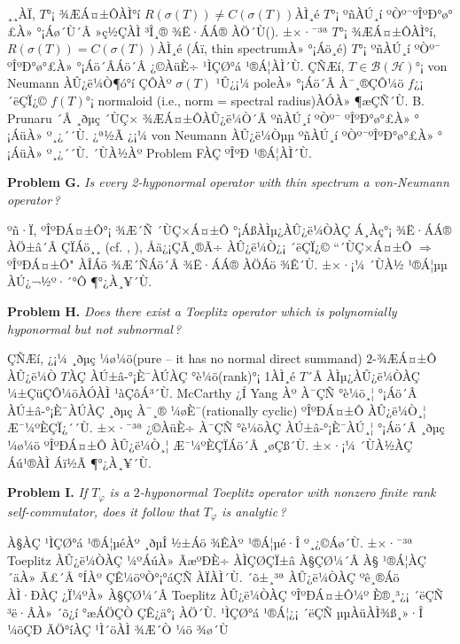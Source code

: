 \documentclass[12pt,a4paper,2sided]{article}
\begin{document}
 ¸¸ÀÏ, $T$°¡ ¾ÆÁ¤±ÔÀÌ°í $R(\sigma(T))\ne
C(\sigma(T))$ÀÌ¸é $T$°¡ ºñÀÚ¸í ºÒº¯ºÎºÐ°ø°£À» °¡Áø´Ù´Â »ç½ÇÀÌ ³Î¸®
¾Ë·ÁÁ® ÀÖ´Ù(\cite{Bro}). ±×·¯³ª $T$°¡ ¾ÆÁ¤±ÔÀÌ°í,
$R(\sigma(T))=C(\sigma(T))$ÀÌ¸é (Áï, thin spectrumÀ» °¡Áö¸é) $T$°¡
ºñÀÚ¸í ºÒº¯ ºÎºÐ°ø°£À» °¡Áö´ÂÁö´Â ¿©ÀüÈ÷ ¹ÌÇØ°á ¹®Á¦ÀÌ´Ù. ÇÑÆí,
$T\in\mathcal{B(H)}$°¡ von Neumann ÀÛ¿ë¼Ò¶ó°í ÇÔÀº $\sigma(T)$
¹Û¿¡¼­ poleÀ» °¡Áö´Â À¯¸®ÇÔ¼ö $f$¿¡ ´ëÇÏ¿© $f(T)$°¡ normaloid (i.e.,
norm = spectral radius)ÀÓÀ» ¶æÇÑ´Ù. B. Prunaru \cite{Pru}´Â ¸ðµç
´ÙÇ× ¾ÆÁ¤±ÔÀÛ¿ë¼Ò´Â ºñÀÚ¸í ºÒº¯ ºÎºÐ°ø°£À» °¡ÁüÀ» º¸¿´´Ù. ¿ª½Ã
\cite{Ag}¿¡¼­ von Neumann ÀÛ¿ë¼Òµµ ºñÀÚ¸í ºÒº¯ºÎºÐ°ø°£À» °¡ÁüÀ»
º¸¿´´Ù. ´ÙÀ½Àº Problem FÀÇ ºÎºÐ ¹®Á¦ÀÌ´Ù.

\vspace{.2 cm}


{\bf Problem G.} {\sl Is every 2-hyponormal operator with thin
spectrum a von-Neumann operator\,? }

\vspace{.2 cm}

ºñ·Ï, ºÎºÐÁ¤±Ô°¡ ¾Æ´Ñ ´ÙÇ×Á¤±Ô °¡ÁßÀÌµ¿ÀÛ¿ë¼ÒÀÇ Á¸Àç°¡ ¾Ë·ÁÁ® ÀÖ±â´Â
ÇÏÁö¸¸ (cf. \cite{CP1}, \cite{CP2}), Åä¿¡ÇÃ¸®Ã÷ ÀÛ¿ë¼Ò¿¡ ´ëÇÏ¿©
``´ÙÇ×Á¤±Ô $\Rightarrow$ ºÎºÐÁ¤±Ô" ÀÎÁö ¾Æ´ÑÁö´Â ¾Ë·ÁÁ® ÀÖÁö ¾Ê´Ù.
±×·¡¼­ ´ÙÀ½ ¹®Á¦µµ ÀÚ¿¬½º·´°Ô ¶°¿À¸¥´Ù.

\vspace{.2 cm}

{\bf Problem H.} {\sl Does there exist a Toeplitz operator which is
polynomially hyponormal but not subnormal\,? }

\vspace{.2 cm}

ÇÑÆí, \cite{CuL2}¿¡¼­ ¸ðµç ¼ø¼ö(pure -- it has no normal direct
summand) $2$-¾ÆÁ¤±Ô ÀÛ¿ë¼Ò $T$ÀÇ ÀÚ±â-°¡È¯ÀÚÀÇ °è¼ö(rank)°¡ 1ÀÌ¸é
$T$´Â ÀÌµ¿ÀÛ¿ë¼ÒÀÇ ¼±ÇüÇÔ¼öÀÓÀÌ ¹àÇôÁ³´Ù. McCarthy ¿Í Yang
\cite{McCYa}Àº À¯ÇÑ °è¼ö¸¦ °¡Áö´Â ÀÚ±â-°¡È¯ÀÚÀÇ ¸ðµç À¯¸®
¼øÈ¯(rationally cyclic) ºÎºÐÁ¤±Ô ÀÛ¿ë¼Ò¸¦ Æ¯¼ºÈ­ÇÏ¿´´Ù. ±×·¯³ª
¿©ÀüÈ÷ À¯ÇÑ °è¼öÀÇ ÀÚ±â-°¡È¯ÀÚ¸¦ °¡Áö´Â ¸ðµç ¼ø¼ö ºÎºÐÁ¤±Ô ÀÛ¿ë¼Ò¸¦
Æ¯¼ºÈ­ÇÏÁö´Â ¸øÇß´Ù. ±×·¡¼­ ´ÙÀ½ÀÇ Áú¹®ÀÌ Áï½Ã ¶°¿À¸¥´Ù.

\vspace{.2 cm} {\bf Problem I.} {\sl If $T_\varphi$ is a
$2$-hyponormal Toeplitz operator with nonzero finite rank
self-commutator, does it follow that $T_\varphi$ is analytic\,? }

\vspace{.2 cm}

À§ÀÇ ¹ÌÇØ°á ¹®Á¦µéÀº ¸ðµÎ ½±Áö ¾ÊÀº ¹®Á¦µé·Î º¸¿©Áø´Ù. ±×·¯³ª
Toeplitz ÀÛ¿ë¼ÒÀÇ ¼ºÁúÀ» ÃæºÐÈ÷ ÀÌÇØÇÏ±â À§ÇØ¼­´Â À§ ¹®Á¦ÀÇ ´äÀ»
Ã£´Â °ÍÀº ÇÊ¼öºÒ°¡°áÇÑ ÀÏÀÌ´Ù. ´õ±¸³ª ÀÛ¿ë¼ÒÀÇ ºê¸®Áö ÀÌ·ÐÀÇ ¿Ï¼ºÀ»
À§ÇØ¼­´Â Toeplitz ÀÛ¿ë¼ÒÀÇ ºÎºÐÁ¤±Ô¼º È®¸³¿¡ ´ëÇÑ ³ë·ÂÀ» ´õ¿í °æÁÖÇÒ
ÇÊ¿ä°¡ ÀÖ´Ù. ¹ÌÇØ°á ¹®Á¦¿¡ ´ëÇÑ µµÀüÀÌ¾ß¸»·Î ¼öÇÐ ÃÖ°íÀÇ ¹Ì´öÀÌ ¾Æ´Ò
¼ö ¾ø´Ù
\end{document}
